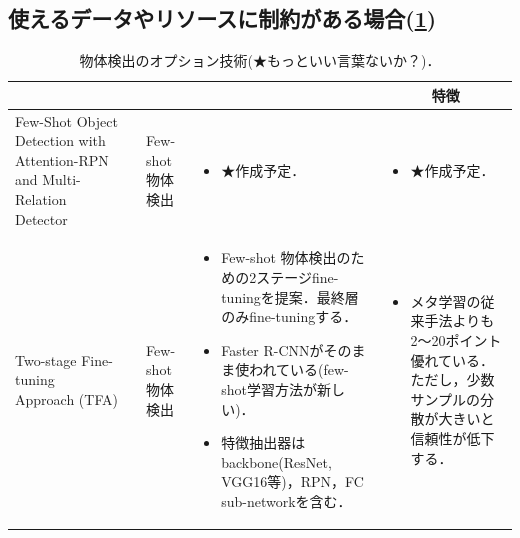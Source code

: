 \documentclass[originalpaper,fleqn]{jsaiart}     %
\begin{document}
\subsection{使えるデータやリソースに制約がある場合(\ref{tbl-select-sub})}
\begin{table}
    \caption{物体検出のオプション技術(★もっといい言葉ないか？)．}
    \label{tbl-select-sub}
    \begin{center}
        \setlength{\tabcolsep}{3pt}
        \footnotesize
        \begin{tabularx}{\linewidth}{Xp{1.5cm}Xp{7cm}X} \toprule
            \centering{モデル名称} & \centering{文献} & \centering{用途} & \centering{概要} & \multicolumn{1}{c}{特徴} \\ \midrule

            Few-Shot Object Detection with Attention-RPN and Multi-Relation Detector 
            \vspace{0.7\baselineskip}
            &  & Few-shot 物体検出 & 
            \begin{itemize}
                \vspace{-0.7\baselineskip}
                \setlength{\leftskip}{-3mm}
                \item ★作成予定．
            \end{itemize}
            &
            \begin{itemize}
                \vspace{-0.7\baselineskip}
                \setlength{\leftskip}{-3mm}
                \item ★作成予定．
            \end{itemize}
            \\

            Two-stage Fine-tuning Approach (TFA) & \cite{WHGDY20} & Few-shot 物体検出 & 
            \begin{itemize}
                \vspace{-0.7\baselineskip}
                \setlength{\leftskip}{-3mm}
                \item Few-shot 物体検出のための2ステージfine-tuningを提案．最終層のみfine-tuningする．
                \item Faster R-CNNがそのまま使われている(few-shot学習方法が新しい)．
                \item 特徴抽出器は backbone(ResNet, VGG16等)，RPN，FC sub-networkを含む．
            \end{itemize}
            &
            \begin{itemize}
                \vspace{-0.7\baselineskip}
                \setlength{\leftskip}{-3mm}
                \item メタ学習の従来手法よりも2〜20ポイント優れている．ただし，少数サンプルの分散が大きいと信頼性が低下する．
            \end{itemize}
            \\


\end{tabularx}
\end{center}
\end{table}
\end{document}
